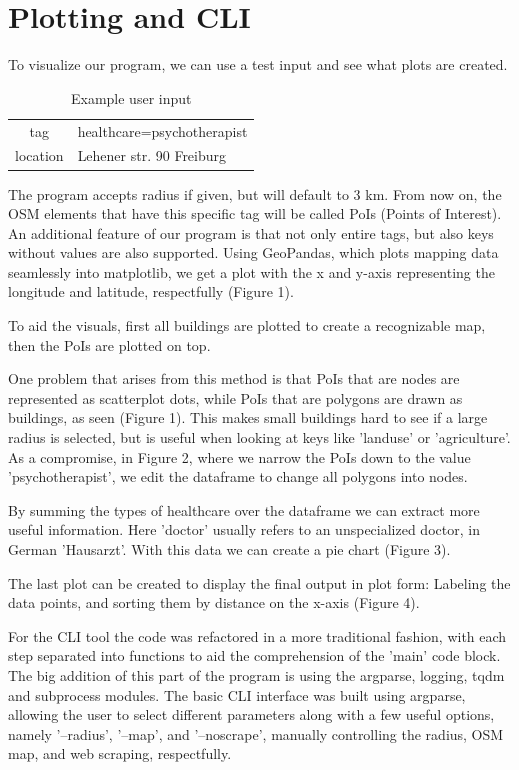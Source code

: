 \documentclass[runningheads]{llncs}
\begin{document}
\section{Plotting and CLI}
To visualize our program, we can use a test input and see what plots are created.

\begin{table}[]
    \centering
    \begin{tabular}{c | l}
        tag &  healthcare=psychotherapist \\
        location & Lehener str. 90 Freiburg
    \end{tabular}
    \bigskip
    \caption{Example user input}
    \label{tab:my_label}
\end{table}

The program accepts radius if given, but will default to 3 km. From now on, the OSM elements that have this specific tag will be called PoIs (Points of Interest). An additional feature of our program is that not only entire tags, but also keys without values are also supported. Using GeoPandas, which plots mapping data seamlessly into matplotlib, we get a plot with the x and y-axis representing the longitude and latitude, respectfully (Figure 1).


To aid the visuals, first all buildings are plotted to create a recognizable map, then the PoIs are plotted on top. 

One problem that arises from this method is that PoIs that are nodes are represented as scatterplot dots, while PoIs that are polygons are drawn as buildings, as seen (Figure 1). This makes small buildings hard to see if a large radius is selected, but is useful when looking at keys like 'landuse' or 'agriculture'. As a compromise, in Figure 2, where we narrow the PoIs down to the value 'psychotherapist', we edit the dataframe to change all polygons into nodes.



By summing the types of healthcare over the dataframe we can extract more useful information. Here 'doctor' usually refers to an unspecialized doctor, in German 'Hausarzt'. With this data we can create a pie chart (Figure 3).


The last plot can be created to display the final output in plot form: Labeling the data points, and sorting them by distance on the x-axis (Figure 4).


For the CLI tool the code was refactored in a more traditional fashion, with each step separated into functions to aid the comprehension of the 'main' code block. The big addition of this part of the program is using the argparse, logging, tqdm and subprocess modules. The basic CLI interface was built using argparse, allowing the user to select different parameters along with a few useful options, namely '--radius', '--map', and '--noscrape', manually controlling the radius, OSM map, and web scraping, respectfully. 
\end{document}
